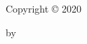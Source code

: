\setcounter{page}{3}

\begin{center}

  \vspace*{\fill}

  \thetitle

  \vspace{3em}

  Copyright {\copyright} 2020

  by

  \theauthor

\end{center}

